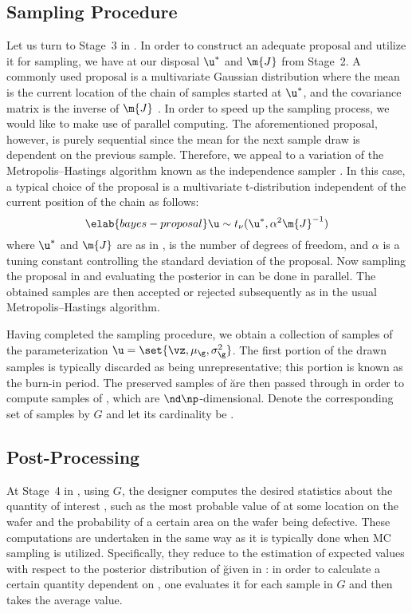 \subsection{Sampling Procedure}

Let us turn to Stage~3 in . In order to construct an
adequate proposal and utilize it for sampling, we have at our disposal $\u^*$
and $\m{J}$ from Stage~2. A commonly used proposal is a multivariate Gaussian
distribution where the mean is the current location of the chain of samples
started at $\u^*$, and the covariance matrix is the inverse of $\m{J}$
\cite{gelman2013}. In order to speed up the sampling process, we would like to
make use of parallel computing. The aforementioned proposal, however, is purely
sequential since the mean for the next sample draw is dependent on the previous
sample. Therefore, we appeal to a variation of the Metropolis--Hastings
algorithm known as the independence sampler \cite{gelman2013}. In this case, a
typical choice of the proposal is a multivariate t-distribution independent of
the current position of the chain as follows:
\begin{equation} \elab{bayes-proposal}
  \u \sim t_\nu(\u^*, \alpha^2 \m{J}^{-1})
\end{equation}
where $\u^*$ and $\m{J}$ are as in , \nu is the number
of degrees of freedom, and $\alpha$ is a tuning constant controlling the
standard deviation of the proposal. Now sampling the proposal in
 and evaluating the posterior in  can
be done in parallel. The obtained samples are then accepted or rejected
subsequently as in the usual Metropolis--Hastings algorithm.

Having completed the sampling procedure, we obtain a collection of samples of
the parameterization $\u = \set{\vz, \mu_\g, \sigma^2_\g}$. The first portion of
the drawn samples is typically discarded as being unrepresentative; this portion
is known as the burn-in period. The preserved samples of \u are then passed
through  in order to compute samples of \g, which are $\nd
\np$-dimensional. Denote the corresponding set of samples by $G$ and let its
cardinality be \no.

\subsection{Post-Processing}

At Stage~4 in , using $G$, the designer computes the
desired statistics about the quantity of interest \g, such as the most probable
value of \g at some location on the wafer and the probability of a certain area
on the wafer being defective. These computations are undertaken in the same way
as it is typically done when \ac{MC} sampling is utilized. Specifically, they
reduce to the estimation of expected values with respect to the posterior
distribution of \u given in : in order to calculate a
certain quantity dependent on \g, one evaluates it for each sample in $G$ and
then takes the average value.

